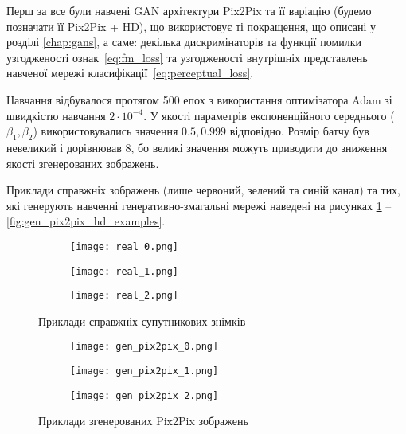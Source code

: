 Перш за все були навчені GAN архітектури Pix2Pix та її варіацію
(будемо позначати її Pix2Pix + HD),
що використовує ті покращення, що
описані у розділі \ref{chap:gans}, а саме:
декілька дискримінаторів та функції помилки узгодженості
ознак~\eqref{eq:fm_loss} та узгодженості внутрішніх представлень
навченої мережі класифікації~\eqref{eq:perceptual_loss}.

Навчання відбувалося протягом 500 епох з використання
оптимізатора Adam \cite{kingma2014adam} зі швидкістю навчання
$2 \cdot 10^{-4}$. У якості параметрів експоненційного
середнього ($\beta_1, \beta_2$) використовувались
значення $0.5, 0.999$ відповідно. Розмір батчу був невеликий і
дорівнював $8$, бо великі значення можуть приводити до
зниження якості згенерованих зображень.

Приклади справжніх зображень (лише червоний, зелений та синій канал)
та тих, які генерують навченні
генеративно-змагальні мережі наведені на рисунках
\ref{fig:real_examples} -- \ref{fig:gen_pix2pix_hd_examples}.

\begin{figure}[ht]
    \centering
    \begin{subfigure}[b]{0.3\textwidth}
        \texttt{[image: real\_0.png]}
    \end{subfigure}
    \begin{subfigure}[b]{0.3\textwidth}
        \texttt{[image: real\_1.png]}
    \end{subfigure}
    \begin{subfigure}[b]{0.3\textwidth}
        \texttt{[image: real\_2.png]}
    \end{subfigure}
    \caption{Приклади справжніх супутникових знімків}
    \label{fig:real_examples}
\end{figure}

\begin{figure}[ht]
    \centering
    \begin{subfigure}[b]{0.3\textwidth}
        \texttt{[image: gen\_pix2pix\_0.png]}
    \end{subfigure}
    \begin{subfigure}[b]{0.3\textwidth}
        \texttt{[image: gen\_pix2pix\_1.png]}
    \end{subfigure}
    \begin{subfigure}[b]{0.3\textwidth}
        \texttt{[image: gen\_pix2pix\_2.png]}
    \end{subfigure}
    \caption{Приклади згенерованих Pix2Pix зображень}
    \label{fig:gen_pix2pix_examples}
\end{figure}

